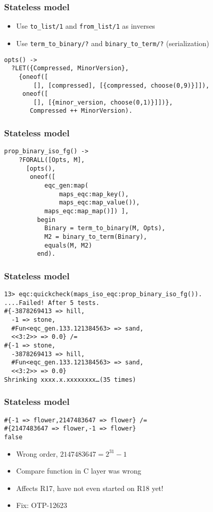 \documentclass[lualatex]{beamer}
\begin{document}
\begin{frame}[fragile]
\frametitle{Stateless model}
\begin{itemize}
\item Use \texttt{to\_list/1} and \texttt{from\_list/1} as inverses
\item Use \texttt{term\_to\_binary/?} and \texttt{binary\_to\_term/?} (serialization)
\end{itemize}

\begin{verbatim}
opts() ->
  ?LET({Compressed, MinorVersion},
    {oneof([
        [], [compressed], [{compressed, choose(0,9)}]]),
     oneof([
        [], [{minor_version, choose(0,1)}]])},
       Compressed ++ MinorVersion).
\end{verbatim}

\end{frame}

\begin{frame}[fragile]
\frametitle{Stateless model}

\begin{verbatim}
prop_binary_iso_fg() ->
    ?FORALL([Opts, M],
      [opts(),
       oneof([
           eqc_gen:map(
               maps_eqc:map_key(),
               maps_eqc:map_value()),
           maps_eqc:map_map()]) ],
         begin
           Binary = term_to_binary(M, Opts),
           M2 = binary_to_term(Binary),
           equals(M, M2)
         end).
\end{verbatim}

\end{frame}

\begin{frame}[fragile]
\frametitle{Stateless model}

\begin{verbatim}
13> eqc:quickcheck(maps_iso_eqc:prop_binary_iso_fg()).
....Failed! After 5 tests.
#{-3878269413 => hill,
  -1 => stone,
  #Fun<eqc_gen.133.121384563> => sand,
  <<3:2>> => 0.0} /= 
#{-1 => stone,
  -3878269413 => hill,
  #Fun<eqc_gen.133.121384563> => sand,
  <<3:2>> => 0.0}
Shrinking xxxx.x.xxxxxxxx…(35 times)
\end{verbatim}
\end{frame}

\begin{frame}[fragile]
\frametitle{Stateless model}

\begin{verbatim}
#{-1 => flower,2147483647 => flower} /=
#{2147483647 => flower,-1 => flower}
false
\end{verbatim}

\begin{itemize}
\item Wrong order, $2147483647 = 2^{31}-1$
\item Compare function in C layer was wrong
\item Affects R17, have not even started on R18 yet!
\item Fix: OTP-12623
\end{itemize}

\end{frame}
\end{document}
